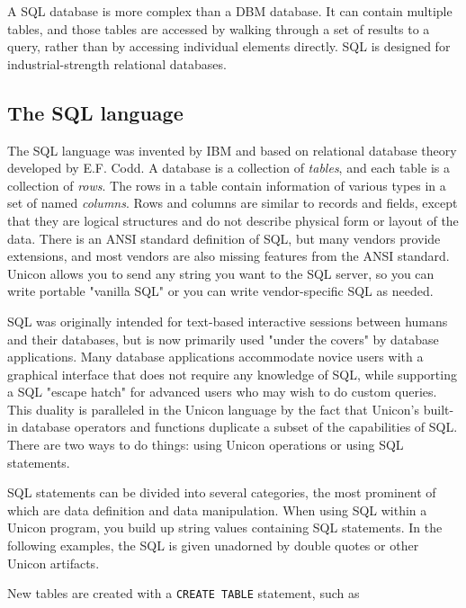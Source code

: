 A SQL database is more complex than a DBM database. It can contain
multiple tables, and those tables are accessed by walking through a set
of results to a query, rather than by accessing individual elements
directly. SQL is designed for industrial-strength relational databases.

\subsection{The SQL language}

The SQL language was invented by IBM and based on relational database
theory developed by E.F. Codd. A database is a collection of
\textit{tables}, and each table is a collection of \textit{rows}. The
rows in a table contain information of various types in a set of named
\textit{columns}. Rows and columns are similar to records and fields,
except that they are logical structures and do not describe physical
form or layout of the data. There is an ANSI standard definition of
SQL, but many vendors provide extensions, and most vendors are also
missing features from the ANSI standard. Unicon allows you to send any
string you want to the SQL server, so you can write portable
"vanilla SQL" or you can write
vendor-specific SQL as needed.

SQL was originally intended for text-based interactive sessions between
humans and their databases, but is now primarily used
"under the covers" by database
applications. Many database applications accommodate novice users with
a graphical interface that does not require any knowledge of SQL, while
supporting a SQL "escape hatch" for
advanced users who may wish to do custom queries. This duality is
paralleled in the Unicon language by the fact that
Unicon's built-in database operators and functions
duplicate a subset of the capabilities of SQL. There are two ways to do
things: using Unicon operations or using SQL statements.

SQL statements can be divided into several categories, the most
prominent of which are data definition and data manipulation. When
using SQL within a Unicon program, you build up string values
containing SQL statements. In the following examples, the SQL is given
unadorned by double quotes or other Unicon artifacts.

New tables are created with a \texttt{CREATE TABLE} statement, such as


